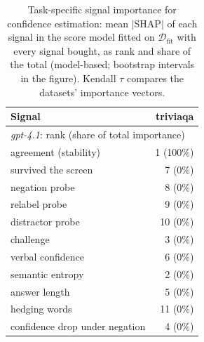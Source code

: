\begin{table}[t]
\centering
\small
\begin{tabular}{lr}
\toprule
Signal & triviaqa \\
\midrule
\multicolumn{2}{l}{\emph{gpt-4.1}: rank (share of total importance)} \\
agreement (stability) & 1 (100\%) \\
survived the screen & 7 (0\%) \\
negation probe & 8 (0\%) \\
relabel probe & 9 (0\%) \\
distractor probe & 10 (0\%) \\
challenge & 3 (0\%) \\
verbal confidence & 6 (0\%) \\
semantic entropy & 2 (0\%) \\
answer length & 5 (0\%) \\
hedging words & 11 (0\%) \\
confidence drop under negation & 4 (0\%) \\
\bottomrule
\end{tabular}
\caption{Task-specific signal importance for confidence estimation: mean $|$SHAP$|$ of each signal in the score model fitted on $\mathcal{D}_{\mathrm{fit}}$ with every signal bought, as rank and share of the total (model-based; bootstrap intervals in the figure). Kendall $\tau$ compares the datasets' importance vectors.}
\label{tab:signal-importance}
\end{table}
